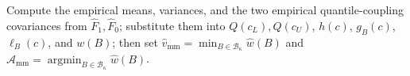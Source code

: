 Compute the empirical means, variances, and the two empirical quantile-coupling covariances from \(\widehat F_1,\widehat F_0\); substitute them into \(Q(c_L),Q(c_U)\), \(h(c)\), \(g_B(c)\), \(\ell_B(c)\), and \(w(B)\); then set \(\widehat v_{\mathrm{mm}}=\min_{B\in\mathcal B_\kappa}\widehat w(B)\) and \(\widehat{\mathcal A}_{\mathrm{mm}}=\operatorname*{argmin}_{B\in\mathcal B_\kappa}\widehat w(B)\).